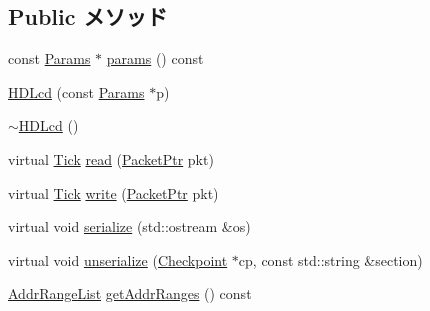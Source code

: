 \subsection*{Public メソッド}
\begin{DoxyCompactItemize}
\item 
const \hyperlink{classHDLcd_a31ccb03af3b5962a67bed42eca6ce2f0}{Params} $\ast$ \hyperlink{classHDLcd_acd3c3feb78ae7a8f88fe0f110a718dff}{params} () const 
\item 
\hyperlink{classHDLcd_a02114caff8968787e64ab481aeb6ae09}{HDLcd} (const \hyperlink{classHDLcd_a31ccb03af3b5962a67bed42eca6ce2f0}{Params} $\ast$p)
\item 
\hyperlink{classHDLcd_af9e41a7cf9baf266c10c60ea6fb4b529}{$\sim$HDLcd} ()
\item 
virtual \hyperlink{base_2types_8hh_a5c8ed81b7d238c9083e1037ba6d61643}{Tick} \hyperlink{classHDLcd_a613ec7d5e1ec64f8d21fec78ae8e568e}{read} (\hyperlink{classPacket}{PacketPtr} pkt)
\item 
virtual \hyperlink{base_2types_8hh_a5c8ed81b7d238c9083e1037ba6d61643}{Tick} \hyperlink{classHDLcd_a4cefab464e72b5dd42c003a0a4341802}{write} (\hyperlink{classPacket}{PacketPtr} pkt)
\item 
virtual void \hyperlink{classHDLcd_a53e036786d17361be4c7320d39c99b84}{serialize} (std::ostream \&os)
\item 
virtual void \hyperlink{classHDLcd_af22e5d6d660b97db37003ac61ac4ee49}{unserialize} (\hyperlink{classCheckpoint}{Checkpoint} $\ast$cp, const std::string \&section)
\item 
\hyperlink{classstd_1_1list}{AddrRangeList} \hyperlink{classHDLcd_a36cf113d5e5e091ebddb32306c098fae}{getAddrRanges} () const 
\end{DoxyCompactItemize}
